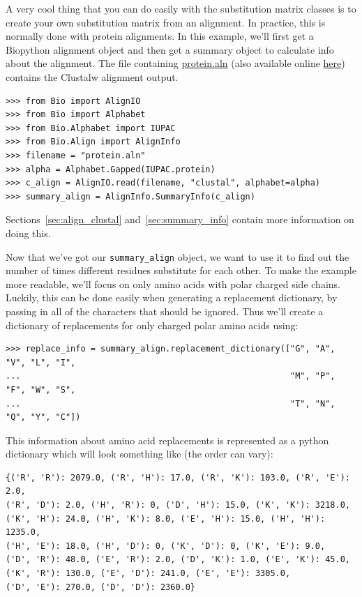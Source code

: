 \documentclass{report}
\begin{document}
A very cool thing that you can do easily with the substitution matrix
classes is to create your own substitution matrix from an
alignment. In practice, this is normally done with protein
alignments. In this example, we'll first get a Biopython alignment
object and then get a summary object to calculate info about the
alignment. The file containing \href{examples/protein.aln}{protein.aln}
(also available online
\href{http://biopython.org/DIST/docs/tutorial/examples/protein.aln}{here})
contains the Clustalw alignment output.

\begin{verbatim}
>>> from Bio import AlignIO
>>> from Bio import Alphabet
>>> from Bio.Alphabet import IUPAC
>>> from Bio.Align import AlignInfo
>>> filename = "protein.aln"
>>> alpha = Alphabet.Gapped(IUPAC.protein)
>>> c_align = AlignIO.read(filename, "clustal", alphabet=alpha)
>>> summary_align = AlignInfo.SummaryInfo(c_align)
\end{verbatim}

Sections~\ref{sec:align_clustal} and~\ref{sec:summary_info} contain
more information on doing this.

Now that we've got our \verb|summary_align| object, we want to use it
to find out the number of times different residues substitute for each
other. To make the example more readable, we'll focus on only amino
acids with polar charged side chains. Luckily, this can be done easily
when generating a replacement dictionary, by passing in all of the
characters that should be ignored. Thus we'll create a dictionary of
replacements for only charged polar amino acids using:

\begin{verbatim}
>>> replace_info = summary_align.replacement_dictionary(["G", "A", "V", "L", "I",
...                                                      "M", "P", "F", "W", "S",
...                                                      "T", "N", "Q", "Y", "C"])
\end{verbatim}

This information about amino acid replacements is represented as a
python dictionary which will look something like (the order can vary):

\begin{verbatim}
{('R', 'R'): 2079.0, ('R', 'H'): 17.0, ('R', 'K'): 103.0, ('R', 'E'): 2.0,
('R', 'D'): 2.0, ('H', 'R'): 0, ('D', 'H'): 15.0, ('K', 'K'): 3218.0,
('K', 'H'): 24.0, ('H', 'K'): 8.0, ('E', 'H'): 15.0, ('H', 'H'): 1235.0,
('H', 'E'): 18.0, ('H', 'D'): 0, ('K', 'D'): 0, ('K', 'E'): 9.0,
('D', 'R'): 48.0, ('E', 'R'): 2.0, ('D', 'K'): 1.0, ('E', 'K'): 45.0,
('K', 'R'): 130.0, ('E', 'D'): 241.0, ('E', 'E'): 3305.0,
('D', 'E'): 270.0, ('D', 'D'): 2360.0}
\end{verbatim}
\end{document}
